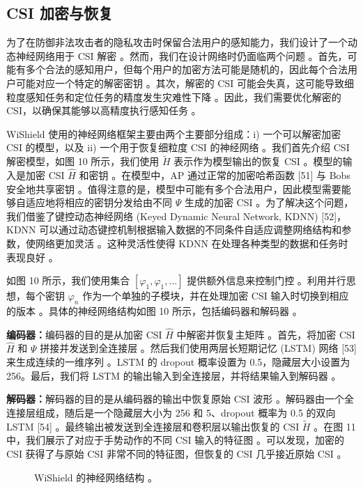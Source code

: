 \documentclass[journal]{IEEEtran}
\begin{document}
\subsection{CSI 加密与恢复}
为了在防御非法攻击者的隐私攻击时保留合法用户的感知能力，我们设计了一个动态神经网络用于 CSI 解密 。然而，我们在设计网络时仍面临两个问题 。首先，可能有多个合法的感知用户，但每个用户的加密方法可能是随机的，因此每个合法用户可能对应一个特定的解密密钥 。其次，解密的 CSI 可能会失真，这可能导致细粒度感知任务和定位任务的精度发生灾难性下降 。因此，我们需要优化解密的 CSI，以确保其能够以高精度执行感知任务 。

WiShield 使用的神经网络框架主要由两个主要部分组成：i) 一个可以解密加密 CSI 的模型，以及 ii) 一个用于恢复细粒度 CSI 的神经网络 。我们首先介绍 CSI 解密模型，如图 10 所示，我们使用 $\tilde{H}$ 表示作为模型输出的恢复 CSI 。模型的输入是加密 CSI $\hat{H}$ 和密钥 。在模型中，AP 通过正常的加密哈希函数 [51] 与 Bobs 安全地共享密钥 。值得注意的是，模型中可能有多个合法用户，因此模型需要能够自适应地将相应的密钥分发给由不同 $\Psi$ 生成的加密 CSI 。为了解决这个问题，我们借鉴了键控动态神经网络 (Keyed Dynamic Neural Network, KDNN) [52]，KDNN 可以通过动态键控机制根据输入数据的不同条件自适应调整网络结构和参数，使网络更加灵活 。这种灵活性使得 KDNN 在处理各种类型的数据和任务时表现良好 。

如图 10 所示，我们使用集合 $[\varphi_{1},\varphi_{1},...]$ 提供额外信息来控制门控 。利用并行思想，每个密钥 $\varphi_{n}$ 作为一个单独的子模块，并在处理加密 CSI 输入时切换到相应的版本 。具体的神经网络结构如图 10 所示，包括编码器和解码器 。

\textbf{编码器：}编码器的目的是从加密 CSI $\hat{H}$ 中解密并恢复主矩阵 。首先，将加密 CSI $\hat{H}$ 和 $\Psi$ 拼接并发送到全连接层 。然后我们使用两层长短期记忆 (LSTM) 网络 [53] 来生成连续的一维序列 。LSTM 的 dropout 概率设置为 0.5，隐藏层大小设置为 256。最后，我们将 LSTM 的输出输入到全连接层，并将结果输入到解码器 。

\textbf{解码器：}解码器的目的是从编码器的输出中恢复原始 CSI 波形 。解码器由一个全连接层组成，随后是一个隐藏层大小为 256 和 5、dropout 概率为 0.5 的双向 LSTM [54] 。最终输出被发送到全连接层和卷积层以输出恢复的 CSI $\tilde{H}$ 。在图 11 中，我们展示了对应于手势动作的不同 CSI 输入的特征图 。可以发现，加密的 CSI 获得了与原始 CSI 非常不同的特征图，但恢复的 CSI 几乎接近原始 CSI 。

\begin{figure}[htbp]
\centering
\caption{WiShield 的神经网络结构 。}
\label{fig:network_structure}
\end{figure}
\end{document}

